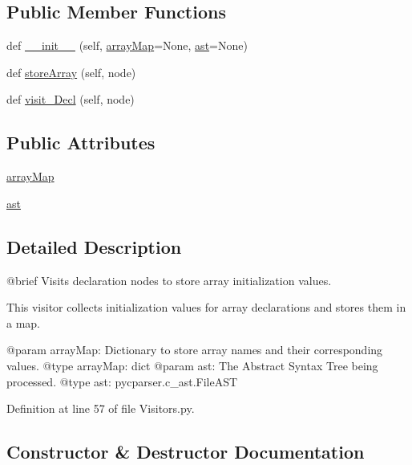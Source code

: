 \subsection*{Public Member Functions}
\begin{DoxyCompactItemize}
\item 
def \hyperlink{classVisitors_1_1DeclVisitor_a0997355e72bfeeb0091a98ad9b380dd6}{\+\_\+\+\_\+init\+\_\+\+\_\+} (self, \hyperlink{classVisitors_1_1DeclVisitor_a3c14dac355802b0266a75f0ee417c14b}{array\+Map}=None, \hyperlink{classVisitors_1_1DeclVisitor_a83d838e3813fb5999c0492e0d9474bd9}{ast}=None)
\item 
def \hyperlink{classVisitors_1_1DeclVisitor_a9e0516fab7677e7c20e7761b239d5a88}{store\+Array} (self, node)
\item 
def \hyperlink{classVisitors_1_1DeclVisitor_a6568bead87923bbcaa593e5f226920f0}{visit\+\_\+\+Decl} (self, node)
\end{DoxyCompactItemize}
\subsection*{Public Attributes}
\begin{DoxyCompactItemize}
\item 
\hyperlink{classVisitors_1_1DeclVisitor_a3c14dac355802b0266a75f0ee417c14b}{array\+Map}
\item 
\hyperlink{classVisitors_1_1DeclVisitor_a83d838e3813fb5999c0492e0d9474bd9}{ast}
\end{DoxyCompactItemize}


\subsection{Detailed Description}
\begin{DoxyVerb}@brief Visits declaration nodes to store array initialization values.

This visitor collects initialization values for array declarations and stores them in a map.

@param arrayMap: Dictionary to store array names and their corresponding values.
@type arrayMap: dict
@param ast: The Abstract Syntax Tree being processed.
@type ast: pycparser.c_ast.FileAST
\end{DoxyVerb}
 

Definition at line 57 of file Visitors.\+py.



\subsection{Constructor \& Destructor Documentation}
\mbox{\label{classVisitors_1_1DeclVisitor_a0997355e72bfeeb0091a98ad9b380dd6}} 

